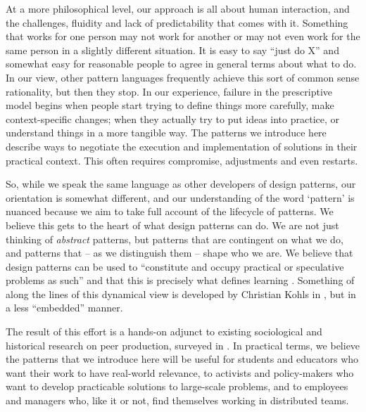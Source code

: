 At a more philosophical level, our approach is all about human interaction, and the challenges, fluidity and lack of predictability that comes with it.  Something that works for one person may not work for another or may not even work for the same person in a slightly different situation.  It is easy to say ``just do X'' and somewhat easy for reasonable people to agree in general terms about what to do.  In our view, other pattern languages frequently achieve this sort of common sense rationality, but then they stop.  In our experience, failure in the prescriptive model begins when people start trying to define things more carefully, make context-specific changes; when they actually try to put ideas into practice, or understand things in a more tangible way. The patterns we introduce here describe ways to negotiate the execution and implementation of solutions in their practical context.  This often requires compromise, adjustments and even restarts.  

So, while we speak the same language as other developers of design patterns, our orientation is somewhat different, and our understanding of the word `pattern' is nuanced because we aim to take full account of the lifecycle of patterns.  We believe this gets to the heart of what design patterns can do.  We are not just thinking of \emph{abstract} patterns, but patterns that are contingent on what we do, and patterns that -- as we distinguish them -- shape who we are.   We believe that design patterns can be used to ``constitute and occupy practical or speculative problems as such'' and that this is precisely what defines learning \cite[p. 204]{deleuze1994difference}.   Something of along the lines of this dynamical view
is developed by Christian Kohls in \cite{kohls2010structure,kohls2011structure}, but in a less ``embedded'' manner.

The result of this effort is a hands-on adjunct to existing sociological and historical research on peer production, surveyed in \cite{benkler2015peer}.  In practical terms, we believe the patterns that we introduce here will be useful for students and educators who want their work to have real-world relevance, to activists and policy-makers who want to develop practicable solutions to large-scale problems, and to employees and managers who, like it or not, find themselves working in distributed teams. 


